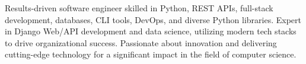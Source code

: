 

\begin{cvparagraph}

Results-driven software engineer skilled in Python, REST APIs, full-stack development, databases, CLI tools, DevOps, and diverse Python libraries. Expert in Django Web/API development and data science, utilizing modern tech stacks to drive organizational success. Passionate about innovation and delivering cutting-edge technology for a significant impact in the field of computer science.
\end{cvparagraph}

